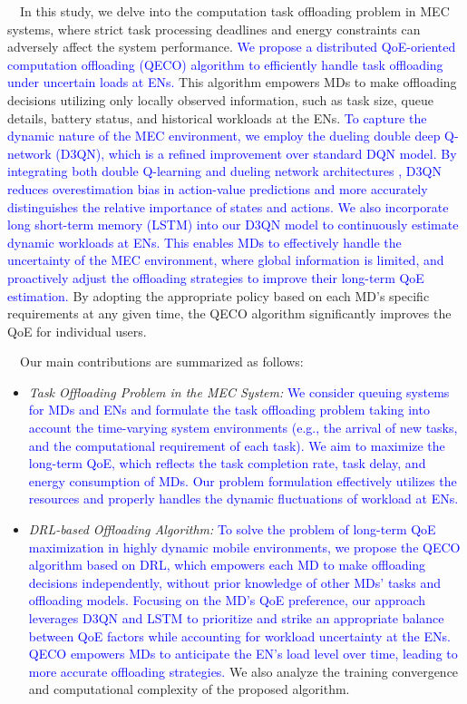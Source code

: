 \documentclass[12pt,draftclsnofoot,onecolumn]{IEEEtran}
\newenvironment{my}[2]%
{\begin{list}{}%
{\setlength{\rightmargin}{#1}\setlength{\leftmargin}{#2}}%


 \item[]{}

} {\end{list}}
\begin{document}
\begin{enumerate}
\begin{my}{1cm}{1cm}
{			
			\,\,\,\,
			In this study, we delve into the computation task offloading problem in MEC systems, where strict task processing deadlines and energy constraints can adversely affect the system performance.   \textcolor{blue}{We propose a distributed QoE-oriented computation offloading (QECO) algorithm to efficiently handle task offloading under uncertain loads at ENs.} This algorithm empowers MDs to make offloading decisions utilizing only locally observed information, such as task size, queue details, battery status, and historical workloads at the ENs. 
			\textcolor{blue}{To capture the dynamic nature of the MEC environment, we employ the dueling double deep Q-network (D3QN), which is a refined improvement over standard DQN model. By integrating both double Q-learning \cite{van2016deep} and dueling network architectures \cite{wang2016dueling}, D3QN reduces overestimation bias in action-value predictions and more accurately distinguishes the relative importance of states and actions. We also incorporate long short-term memory (LSTM) \cite{hochreiter1997long} into our D3QN model to continuously estimate dynamic workloads at ENs. This enables MDs to effectively handle the uncertainty of the MEC environment, where global information is limited, and proactively adjust the offloading strategies to improve their long-term QoE estimation.} By adopting the appropriate policy based on each MD’s specific requirements at any given time, the QECO algorithm significantly improves the QoE for individual users. \vspace{3mm}
			
			\,\,\,\,
			Our main contributions are summarized as follows:
			
			
			\begin{itemize}
				\item \textit{Task Offloading Problem in the MEC System:} \textcolor{blue}{ We consider queuing systems for MDs and ENs and formulate the task offloading problem taking into account the time-varying system environments (e.g., the arrival of new tasks, and the computational requirement of each task). We aim to maximize the long-term QoE, which reflects the task completion rate, task delay, and energy consumption of MDs. Our problem formulation effectively utilizes the resources and properly handles the dynamic fluctuations of workload at ENs. }
				
				
				\item \textit{DRL-based Offloading Algorithm:} \textcolor{blue}{To solve the problem of long-term QoE maximization in highly dynamic mobile environments, we propose the QECO algorithm based on DRL, which empowers each MD to make offloading decisions independently, without prior knowledge of other MDs' tasks and offloading models. Focusing on the MD's QoE preference, our approach leverages D3QN and LSTM to prioritize and strike an appropriate balance between QoE factors while accounting for workload uncertainty at the ENs. QECO empowers MDs to anticipate the EN's load level over time, leading to more accurate offloading strategies.} We also analyze the training convergence and computational complexity of the proposed algorithm.
				

\end{itemize}}
\end{my}
\end{enumerate}
\end{document}
